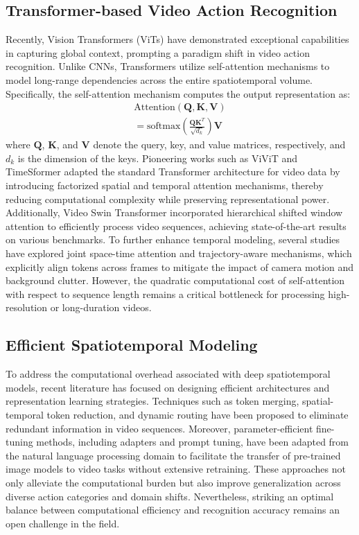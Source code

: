 \documentclass[lettersize,journal]{IEEEtran}
\begin{document}
\subsection{Transformer-based Video Action Recognition}
Recently, Vision Transformers (ViTs) have demonstrated exceptional capabilities in capturing global context, prompting a paradigm shift in video action recognition. Unlike CNNs, Transformers utilize self-attention mechanisms to model long-range dependencies across the entire spatiotemporal volume. Specifically, the self-attention mechanism computes the output representation as:
\begin{multline}

\text{Attention}(\mathbf{Q}, \mathbf{K}, \mathbf{V}) \\
= \text{softmax}\left(\frac{\mathbf{Q}\mathbf{K}^T}{\sqrt{d_k}}\right)\mathbf{V}
\end{multline}
where $\mathbf{Q}$, $\mathbf{K}$, and $\mathbf{V}$ denote the query, key, and value matrices, respectively, and $d_k$ is the dimension of the keys. Pioneering works such as ViViT and TimeSformer adapted the standard Transformer architecture for video data by introducing factorized spatial and temporal attention mechanisms, thereby reducing computational complexity while preserving representational power. Additionally, Video Swin Transformer incorporated hierarchical shifted window attention to efficiently process video sequences, achieving state-of-the-art results on various benchmarks. To further enhance temporal modeling, several studies have explored joint space-time attention and trajectory-aware mechanisms, which explicitly align tokens across frames to mitigate the impact of camera motion and background clutter. However, the quadratic computational cost of self-attention with respect to sequence length remains a critical bottleneck for processing high-resolution or long-duration videos.

\subsection{Efficient Spatiotemporal Modeling}
To address the computational overhead associated with deep spatiotemporal models, recent literature has focused on designing efficient architectures and representation learning strategies. Techniques such as token merging, spatial-temporal token reduction, and dynamic routing have been proposed to eliminate redundant information in video sequences. Moreover, parameter-efficient fine-tuning methods, including adapters and prompt tuning, have been adapted from the natural language processing domain to facilitate the transfer of pre-trained image models to video tasks without extensive retraining. These approaches not only alleviate the computational burden but also improve generalization across diverse action categories and domain shifts. Nevertheless, striking an optimal balance between computational efficiency and recognition accuracy remains an open challenge in the field.
\end{document}
